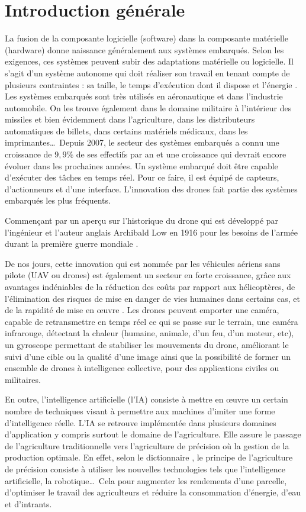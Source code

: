 \chapter*{Introduction générale}
La fusion de la composante logicielle (software) dans la composante matérielle (hardware) donne naissance généralement aux systèmes embarqués.
Selon les exigences, ces systèmes peuvent subir des adaptations matérielle ou logicielle. Il s'agit d'un système autonome qui doit réaliser son travail en tenant compte de plusieurs contraintes : sa taille, le temps d'exécution dont il dispose et l'énergie \cite{FUTURA}. Les systèmes embarqués sont très utilisés en aéronautique et dans l'industrie automobile. On les trouve également dans le domaine militaire à l'intérieur des missiles et bien évidemment dans l'agriculture, dans les distributeurs automatiques de billets, dans certains matériels médicaux, dans les imprimantes\ldots\  Depuis 2007, le secteur des systèmes embarqués a connu une croissance de $9,9\%$ de ses effectifs par an \cite{PierreAudoin2012} et une croissance qui devrait encore évoluer dans les prochaines années. Un système embarqué doit être capable d'exécuter des tâches en temps réel. Pour ce faire, il est équipé de capteurs, d'actionneurs et d'une interface. L'innovation des drones fait partie des systèmes embarqués les plus fréquents. 

Commençant par un aperçu sur l'historique du drone qui est développé par l'ingénieur et l'auteur anglais Archibald Low en 1916 pour les besoins de l'armée durant la première guerre mondiale \cite{STUDIOFLY}. 

De nos jours, cette innovation qui est nommée par les véhicules aériens sans pilote (UAV ou drones) est également un secteur en forte croissance, grâce aux avantages indéniables de la réduction des coûts par rapport aux hélicoptères, de l'élimination des risques de mise en danger de vies humaines dans certains cas, et de la rapidité de mise en œuvre \cite{AltiGator}. Les drones peuvent emporter une caméra, capable de retransmettre en temps réel ce qui se passe sur le terrain, une caméra infrarouge, détectant la chaleur (humaine, animale, d'un feu, d'un moteur, etc), un gyroscope permettant de stabiliser les mouvements du drone, améliorant le suivi d'une cible ou la qualité d'une image ainsi que la possibilité de former un ensemble de drones à intelligence collective, pour des applications civiles ou militaires. 

En outre, l'intelligence artificielle (l'IA) consiste à mettre en œuvre un certain nombre de techniques visant à permettre aux machines d'imiter une forme d'intelligence réelle. L'IA se retrouve implémentée dans plusieurs domaines d'application\cite{netactions} y compris surtout le domaine de l'agriculture. Elle assure le passage de l'agriculture traditionnelle vers l'agriculture de précision où la gestion de la production optimale. En effet, selon le dictionnaire \cite{leshorizons}, le principe de l'agriculture de précision consiste à utiliser les nouvelles technologies tels que l'intelligence artificielle, la robotique\ldots\ Cela pour augmenter les rendements d'une parcelle, d'optimiser le travail des agriculteurs et réduire la consommation d'énergie, d'eau et d'intrants.

